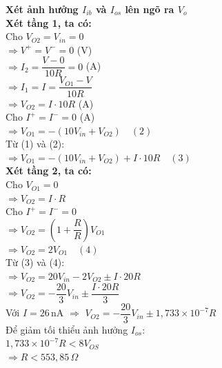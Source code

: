 \begin{flushleft}
\textbf{Xét ảnh hưởng $I_{ib}$ và $I_{os}$ lên ngõ ra $V_o$}\\
\textbf{Xét tầng 1, ta có:}\\[4pt]
Cho $V_{O2} = V_{in} = 0$\\[4pt]
$\Rightarrow V^+ = V^- = 0$ (V)\\[4pt]
$\Rightarrow I_2 = \dfrac{V - 0}{10R} = 0$ (A)\\[4pt]
$\Rightarrow I_1 = I = \dfrac{V_{O1} - V}{10R}$\\[4pt]
$\Rightarrow V_{O2} = I \cdot 10R$ (A)\\[4pt]
Cho $I^+ = I^- = 0$ (A)\\[4pt]
$\Rightarrow V_{O1} = -(10V_{in} + V_{O2}) \quad (2)$\\[4pt]
Từ (1) và (2):\\[4pt]
$\Rightarrow V_{O1} = -(10V_{in} + V_{O2}) + I \cdot 10R \quad (3)$\\[10pt]

\textbf{Xét tầng 2, ta có:}\\[4pt]
Cho $V_{O1} = 0$\\[4pt]
$\Rightarrow V_{O2} = I \cdot R$\\[4pt]
Cho $I^+ = I^- = 0$\\[4pt]
$\Rightarrow V_{O2} = \left( 1 + \dfrac{R}{R} \right) V_{O1}$\\[4pt]
$\Rightarrow V_{O2} = 2V_{O1} \quad (4)$\\[4pt]
Từ (3) và (4):\\[4pt]
$\Rightarrow V_{O2} = 20V_{in} - 2V_{O2} \pm I \cdot 20R$\\[4pt]
$\Rightarrow V_{O2} = -\dfrac{20}{3}V_{in} \pm \dfrac{I \cdot 20R}{3}$\\[8pt]
Với $I = 26\,\text{nA}$ $\Rightarrow$ 
$\boxed{V_{O2} = -\dfrac{20}{3}V_{in} \pm 1{,}733 \times 10^{-7} R}$\\[10pt]

Để giảm tối thiểu ảnh hưởng $I_{os}$:\\[4pt]
$1{,}733 \times 10^{-7} R < 8V_{OS}$\\[4pt]
$\Rightarrow R < 553{,}85\,\Omega$
\end{flushleft}


